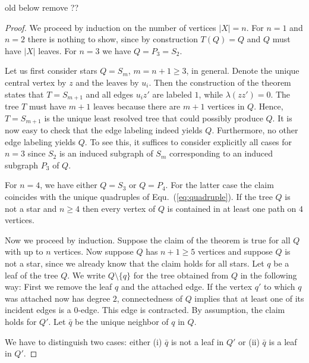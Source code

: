 \documentclass[smallextended]{svjour3}
\newcommand{\remove}[1]{\begingroup\tiny\color{magenta}#1\endgroup}
\begin{document}
\remove{old below  remove ?? 
\begin{proof}
  We proceed by induction on the number of vertices $|X|=n$.  For $n=1$ and
  $n=2$ there is nothing to show, since by construction $T(Q)=Q$ and $Q$
  must have $|X|$ leaves.  For $n=3$ we have $Q=P_3=S_2$.

  Let us first consider stars $Q=S_m$, $m=n+1\ge 3$, in general. Denote the
  unique central vertex by $z$ and the leaves by $u_i$. Then the
  construction of the theorem states that $T=S_{m+1}$ and all edges $u_iz'$
  are labeled $1$, while $\lambda(zz')=0$. The tree $T$ must have $m+1$
  leaves because there are $m+1$ vertices in $Q$. Hence, $T=S_{m+1}$ is the
  unique least resolved tree that could possibly produce $Q$. It is now
  easy to check that the edge labeling indeed yields $Q$. Furthermore, no
  other edge labeling yields $Q$. To see this, it suffices to consider
  explicitly all cases for $n=3$ since $S_2$ is an induced subgraph of
  $S_m$ corresponding to an induced subgraph $P_3$ of $Q$.

  For $n=4$, we have either $Q=S_3$ or $Q=P_4$. For the latter case the
  claim coincides with the unique quadruples of Equ.~(\ref{eq:quadruple}).
  If the tree $Q$ is not a star and $n\ge 4$ then every vertex of $Q$ is
  contained in at least one path on $4$ vertices.

  Now we proceed by induction. Suppose the claim of the theorem is true for
  all $Q$ with up to $n$ vertices. Now suppose $Q$ has $n+1\ge 5$ vertices
  and suppose $Q$ is not a star, since we already know that the claim holds
  for all stars. Let $q$ be a leaf of the tree $Q$. We write
  $Q\setminus\{q\}$ for the tree obtained from $Q$ in the following way:
  First we remove the leaf $q$ and the attached edge. If the vertex $q'$ to
  which $q$ was attached now has degree $2$, connectedness of $Q$ implies
  that at least one of its incident edges is a 0-edge. This edge is
  contracted.  By assumption, the claim holds for $Q'$. Let $\bar q$ be the
  unique neighbor of $q$ in $Q$.
 
  We have to distinguish two cases: either (i) $\bar q$ is not a leaf in
  $Q'$ or (ii) $\bar q$ is a leaf in $Q'$.


\end{proof}}
\end{document}
